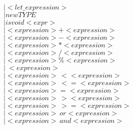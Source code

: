 \documentclass[11pt]{article}
\begin{document}
\begin{enumerate}
                          \hspace*{3.2cm}$|   <let\_expression>$\\
                          \hspace*{3.2cm}$|   new TYPE$\\
                          \hspace*{3.2cm}$|   isvoid <expr>$\\
                          \hspace*{3.2cm}$|   <expression> + <expression>$\\
                          \hspace*{3.2cm}$|   <expression> - <expression>$\\
                          \hspace*{3.2cm}$|   <expression> * <expression>$\\
                          \hspace*{3.2cm}$|   <expression> / <expression>$\\
                          \color{blue}
                          \hspace*{3.2cm}$|   <expression> \% <expression>$\\
                          \color{black}
                          \hspace*{3.2cm}$|   ~ <expression>$\\
                          \hspace*{3.2cm}$|   <expression> \, < <expression>$\\
                          \hspace*{3.2cm}$|   <expression> \,<= <expression>$\\
                          \hspace*{3.2cm}$|   <expression> = <expression>$\\
                          \color{blue}
                          \hspace*{3.2cm}$|   <expression> \,> <expression>$\\
                          \hspace*{3.2cm}$|   <expression> \, >= <expression>$\\
                          \hspace*{3.2cm}$|   <expression> \, or <expression>$\\
                          \hspace*{3.2cm}$|   <expression> \, and <expression>$\\
                          \color{black}

\end{enumerate}
\end{document}
